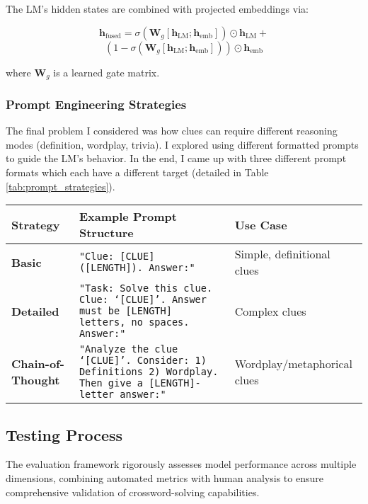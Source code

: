 \documentclass[
	a4paper, %
	10pt, %
	unnumberedsections, %
	twoside, %
]{LTJournalArticle}
\begin{document}
The LM’s hidden states are combined with projected embeddings via:

\[\mathbf{h}_{\text{fused}} = \sigma\left(\mathbf{W}_g \left[\mathbf{h}_{\text{LM}}; \mathbf{h}_{\text{emb}}\right]\right) \odot \mathbf{h}_{\text{LM}} +\]
\[ \left(1 - \sigma\left(\mathbf{W}_g \left[\mathbf{h}_{\text{LM}}; \mathbf{h}_{\text{emb}}\right]\right)\right) \odot \mathbf{h}_{\text{emb}}\]

where $\mathbf{W}_g$ is a learned gate matrix.

\subsubsection{Prompt Engineering Strategies}

The final problem I considered was how clues can require different reasoning modes (definition, wordplay, trivia). I explored using different formatted prompts to guide the LM’s behavior. In the end, I came up with three different prompt formats which each have a different target (detailed in Table \ref{tab:prompt_strategies}).

\begin{table*}[h]
	\centering
	\caption{Prompt Engineering Strategies for Crossword Solving}
	\label{tab:prompt_strategies}
	\begin{tabular}{lp{8cm}l}	
		\hline
		\textbf{Strategy} & \textbf{Example Prompt Structure} & \textbf{Use Case} \\
		\hline
		\textbf{Basic} & \texttt{"Clue: [CLUE] ([LENGTH]). Answer:"} & Simple, definitional clues \\
		\hline
		\textbf{Detailed} & \texttt{"Task: Solve this clue. Clue: `[CLUE]'. Answer must be [LENGTH] letters, no spaces. Answer:"} & Complex clues \\
		\hline
		\textbf{Chain-of-Thought} & \texttt{"Analyze the clue `[CLUE]'. Consider: 1) Definitions 2) Wordplay. Then give a [LENGTH]-letter answer:"} & Wordplay/metaphorical clues \\
		\hline
	\end{tabular}
\end{table*}

\subsection{Testing Process}

The evaluation framework rigorously assesses model performance across multiple dimensions, combining automated metrics with human analysis to ensure comprehensive validation of crossword-solving capabilities.
\end{document}
